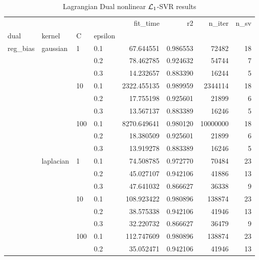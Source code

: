 \begin{table}[H]
\centering
\caption{Lagrangian Dual nonlinear $\protect \mathcal{L}_1$-SVR results}
\label{nonlinear_lagrangian_dual_l1_svr_cv_results}
\begin{tabular}{llllrrrr}
\toprule
           &           &     &     &     fit\_time &        r2 &    n\_iter &  n\_sv \\
dual & kernel & C & epsilon &              &           &           &       \\
\midrule
reg\_bias & gaussian & 1   & 0.1 &    67.644551 &  0.986553 &     72482 &    18 \\
           &           &     & 0.2 &    78.462785 &  0.924632 &     54744 &     7 \\
           &           &     & 0.3 &    14.232657 &  0.883390 &     16244 &     5 \\
           &           & 10  & 0.1 &  2322.455135 &  0.989959 &   2344114 &    18 \\
           &           &     & 0.2 &    17.755198 &  0.925601 &     21899 &     6 \\
           &           &     & 0.3 &    13.567137 &  0.883389 &     16246 &     5 \\
           &           & 100 & 0.1 &  8270.649641 &  0.980120 &  10000000 &    18 \\
           &           &     & 0.2 &    18.380509 &  0.925601 &     21899 &     6 \\
           &           &     & 0.3 &    13.919278 &  0.883389 &     16246 &     5 \\
           & laplacian & 1   & 0.1 &    74.508785 &  0.972770 &     70484 &    23 \\
           &           &     & 0.2 &    45.027107 &  0.942106 &     41886 &    13 \\
           &           &     & 0.3 &    47.641032 &  0.866627 &     36338 &     9 \\
           &           & 10  & 0.1 &   108.923422 &  0.980896 &    138874 &    23 \\
           &           &     & 0.2 &    38.575338 &  0.942106 &     41946 &    13 \\
           &           &     & 0.3 &    32.220732 &  0.866627 &     36479 &     9 \\
           &           & 100 & 0.1 &   112.747609 &  0.980896 &    138874 &    23 \\
           &           &     & 0.2 &    35.052471 &  0.942106 &     41946 &    13 \\

\end{tabular}
\end{table}
